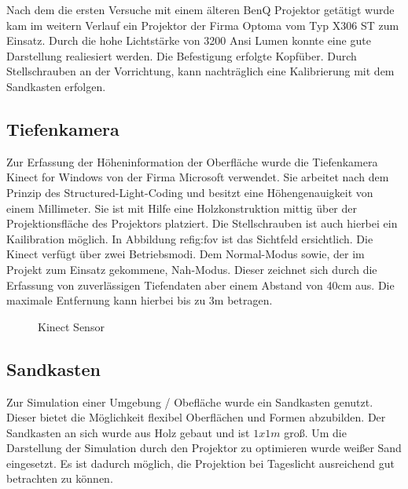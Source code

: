 \begin{Spacing}{\mylinespace}
Nach dem die ersten Versuche mit einem älteren BenQ Projektor getätigt wurde kam im weitern Verlauf ein Projektor der Firma Optoma vom Typ X306 ST zum Einsatz. Durch die hohe Lichtstärke von 3200 Ansi Lumen konnte eine gute Darstellung realiesiert werden. Die Befestigung erfolgte Kopfüber. Durch Stellschrauben an der Vorrichtung, kann nachträglich eine Kalibrierung mit dem Sandkasten erfolgen.

\subsection{Tiefenkamera}

Zur Erfassung der Höheninformation der Oberfläche wurde die Tiefenkamera Kinect for Windows von der Firma Microsoft verwendet. Sie arbeitet nach dem Prinzip des Structured-Light-Coding und besitzt eine Höhengenauigkeit von einem Millimeter. Sie ist mit Hilfe eine Holzkonstruktion mittig über der Projektionsfläche des Projektors platziert. Die Stellschrauben ist auch hierbei ein Kailibration möglich. In Abbildung re{fig:fov} ist das Sichtfeld ersichtlich. Die Kinect verfügt über zwei Betriebsmodi. Dem Normal-Modus sowie, der im Projekt zum Einsatz gekommene, Nah-Modus. Dieser zeichnet sich durch die Erfassung von zuverlässigen Tiefendaten aber einem Abstand von 40cm aus. Die maximale Entfernung kann hierbei bis zu 3m betragen.

\begin{figure}[h!]
	\centering
	\vspace{0.2cm}
	\label{fig:fov}
	\caption{Kinect Sensor}
\end{figure}

\subsection{Sandkasten}

Zur Simulation einer Umgebung / Obefläche wurde ein Sandkasten genutzt. Dieser bietet die Möglichkeit flexibel Oberflächen und Formen abzubilden. Der Sandkasten an sich wurde aus Holz gebaut und ist $1x1m$ groß. Um die Darstellung der Simulation durch den Projektor zu optimieren wurde weißer Sand eingesetzt. Es ist dadurch möglich, die Projektion bei Tageslicht ausreichend gut betrachten zu können.

\end{Spacing}
\newpage
\clearpage
